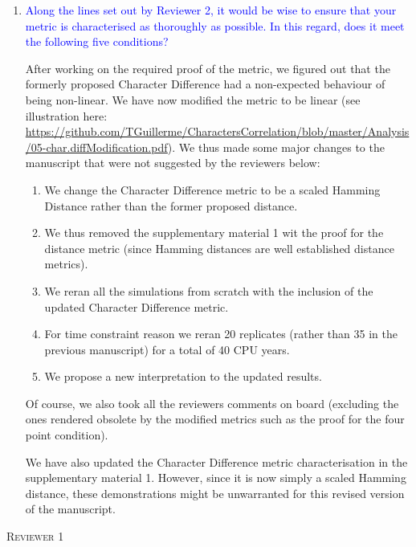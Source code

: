 \documentclass[12pt,letterpaper]{article}
\renewcommand{\section}[1]{%
\bigskip
\begin{center}
\begin{Large}
\normalfont\scshape #1
\medskip
\end{Large}
\end{center}}
\begin{document}
\begin{enumerate}
\label{metric_change}

\item{\textcolor{blue}{Along the lines set out by Reviewer 2, it would be wise to ensure that your metric is characterised as thoroughly as possible. In this regard, does it meet the following five conditions?}}

After working on the required proof of the metric, we figured out that the formerly proposed Character Difference had a non-expected behaviour of being non-linear.
We have now modified the metric to be linear (see illustration here: \url{https://github.com/TGuillerme/CharactersCorrelation/blob/master/Analysis/05-char.diffModification.pdf}).
We thus made some major changes to the manuscript that were not suggested by the reviewers below:
\begin{enumerate}
    \item We change the Character Difference metric to be a scaled Hamming Distance rather than the former proposed distance.
    \item We thus removed the supplementary material 1 wit the proof for the distance metric (since Hamming distances are well established distance metrics).
    \item We reran all the simulations from scratch with the inclusion of the updated Character Difference metric.
    \item For time constraint reason we reran 20 replicates (rather than 35 in the previous manuscript) for a total of 40 CPU years.
    \item We propose a new interpretation to the updated results.
\end{enumerate}

Of course, we also took all the reviewers comments on board (excluding the ones rendered obsolete by the modified metrics such as the proof for the four point condition).

We have also updated the Character Difference metric characterisation in the supplementary material 1.
However, since it is now simply a scaled Hamming distance, these demonstrations might be unwarranted for this revised version of the manuscript.

\end{enumerate}

%
%


\section{Reviewer 1}
\end{document}
